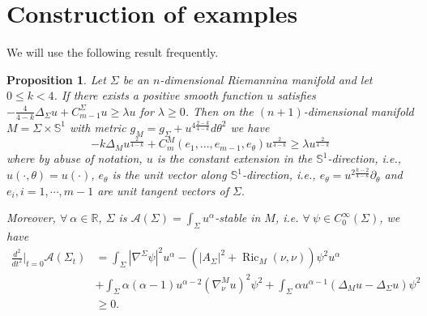 \documentclass[11pt,letterpaper]{amsart}
\DeclareMathOperator{\Ric}{Ric}
\newcommand{\mA}{\mathcal{A}}
\newtheorem{proposition}[theorem]{Proposition}
\theoremstyle{definition}
\theoremstyle{remark}
\numberwithin{equation}{section}
\begin{document}
\section{Construction of examples}\label{section4}
We will use the following result frequently.
\begin{proposition}\label{lift C_m-1 to C_m}
Let $\Sigma$ be an $n$-dimensional Riemannina manifold and let $0\leq k <4$. If there exists a positive smooth function $u$ satisfies $-\frac{4}{4-k}\Delta_{\Sigma}u+C_{m-1}^{\Sigma}u\geq \lambda u$ for $\lambda\geq 0$. Then on the $(n+1)$-dimensional manifold $M=\Sigma\times \mathbb{S}^{1}$ with metric $g_{M}=g_{\Sigma}+u^{4\frac{2-k}{4-k}}d \theta^2$ we have 
\[
-k\Delta_{M}u^{\frac{2}{4-k}}+C_{m}^{M}(e_{1},...,e_{m-1},e_{\theta})u^{\frac{2}{4-k}} \geq \lambda u^{\frac{2}{4-k}}
\]
where by abuse of notation, $u$ is the constant extension  in the $\mathbb{S}^1$-direction, i.e., $u(\cdot,\theta)=u(\cdot)$, $e_\theta$ is the unit vector along  $\mathbb{S}^1$-direction, i.e., $e_\theta=u^{2\frac{k-2}{4-k}}\partial_\theta$ and $e_i, i=1,\cdots,m-1$ are unit tangent vectors of $\Sigma.$

Moreover, $\forall\ \alpha\in \mathbb{R}$, $\Sigma$ is $\mathcal{A}(\Sigma)=\int_{\Sigma}u^{\alpha}$-stable in $M$, i.e. $\forall\ \psi \in C_{0}^{\infty}(\Sigma)$, we have
\begin{equation*}
        \begin{split}
            \frac{d^2}{d t^2}\bigg|_{t=0}\mA(\Sigma_{t})&=\int_{\Sigma}|\nabla^{\Sigma}\psi|^2 u^{\alpha}-\left(|A_{\Sigma}|^2+\Ric_M(\nu,\nu)\right)\psi^2 u^{\alpha}\\
            &+\int_\Sigma \alpha(\alpha-1)u^{\alpha-2}\left(\nabla^M_{\nu}u\right)^2\psi^2 +\int_{\Sigma}\alpha u^{\alpha-1}\left(\Delta_M u-\Delta_{\Sigma} u\right)\psi^2\\
            &\geq 0.
        \end{split}
    \end{equation*}
\end{proposition}
\end{document}
